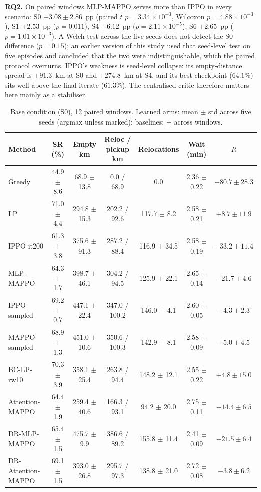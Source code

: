 \documentclass[3p,times,procedia]{elsarticle}
\begin{document}
\textbf{RQ2.} On paired windows MLP-MAPPO serves more than IPPO in every scenario: S0 $+3.08\pm2.86$~pp (paired $t$ $p=3.34\times10^{-3}$, Wilcoxon $p=4.88\times10^{-3}$), S1 $+2.53$~pp ($p=0.011$), S4 $+6.12$~pp ($p=2.11\times10^{-5}$), S6 $+2.65$~pp ($p=1.01\times10^{-3}$). A Welch test across the five seeds does not detect the S0 difference ($p=0.15$); an earlier version of this study used that seed-level test on five episodes and concluded that the two were indistinguishable, which the paired protocol overturns. IPPO's weakness is seed-level collapse: its empty-distance spread is $\pm91.3$~km at S0 and $\pm274.8$~km at S4, and its best checkpoint ($64.1\%$) sits well above the final iterate ($61.3\%$). The centralised critic therefore matters here mainly as a stabiliser.

\begin{table}[tbp]
\centering
\caption{Base condition (S0), 12 paired windows. Learned arms: mean $\pm$ std across five seeds (argmax unless marked); baselines: $\pm$ across windows.}
\label{tab:s0}
\scriptsize
\setlength{\tabcolsep}{2.0pt}
\begin{tabular}{lcccccc}
\toprule
Method & SR (\%) & Empty km & Reloc / pickup km & Relocations & Wait (min) & $R$ \\
\midrule
Greedy             & 44.9 $\pm$ 8.6 & 68.9 $\pm$ 13.8  & 0.0 / 68.9   & 0.0             & 2.36 $\pm$ 0.22 & $-80.7 \pm 28.3$ \\
LP                 & 71.0 $\pm$ 4.4 & 294.8 $\pm$ 15.3 & 202.2 / 92.6 & 117.7 $\pm$ 8.2  & 2.58 $\pm$ 0.21 & $+8.7 \pm 11.9$ \\
IPPO-it200         & 61.3 $\pm$ 3.8 & 375.6 $\pm$ 91.3 & 287.2 / 88.4 & 116.9 $\pm$ 34.5 & 2.58 $\pm$ 0.19 & $-33.2 \pm 11.4$ \\
MLP-MAPPO          & 64.3 $\pm$ 1.7 & 398.7 $\pm$ 46.1 & 304.2 / 94.5 & 125.9 $\pm$ 22.1 & 2.65 $\pm$ 0.14 & $-21.7 \pm 4.6$ \\
\midrule
IPPO sampled       & 69.2 $\pm$ 0.7 & 447.1 $\pm$ 22.4 & 347.0 / 100.2 & 146.0 $\pm$ 4.1 & 2.60 $\pm$ 0.05 & $-4.3 \pm 2.3$ \\
MAPPO sampled      & 68.9 $\pm$ 1.3 & 451.0 $\pm$ 10.6 & 350.6 / 100.3 & 142.9 $\pm$ 8.1 & 2.58 $\pm$ 0.09 & $-5.0 \pm 4.5$ \\
BC-LP-rw10         & 70.3 $\pm$ 3.9 & 358.1 $\pm$ 25.4 & 263.8 / 94.4 & 148.2 $\pm$ 12.1 & 2.55 $\pm$ 0.22 & $+4.8 \pm 15.0$ \\
\midrule
Attention-MAPPO    & 64.4 $\pm$ 1.9 & 259.4 $\pm$ 40.6 & 166.3 / 93.1 & 94.2 $\pm$ 20.0 & 2.75 $\pm$ 0.11 & $-14.4 \pm 6.5$ \\
DR-MLP-MAPPO       & 65.4 $\pm$ 1.5 & 475.7 $\pm$ 9.9  & 386.6 / 89.2 & 155.8 $\pm$ 11.4 & 2.41 $\pm$ 0.09 & $-21.5 \pm 6.4$ \\
DR-Attention-MAPPO & 69.1 $\pm$ 1.5 & 393.0 $\pm$ 26.8 & 295.7 / 97.3 & 138.8 $\pm$ 21.0 & 2.72 $\pm$ 0.08 & $-3.8 \pm 6.2$ \\
\bottomrule
\end{tabular}
\end{table}
\end{document}
